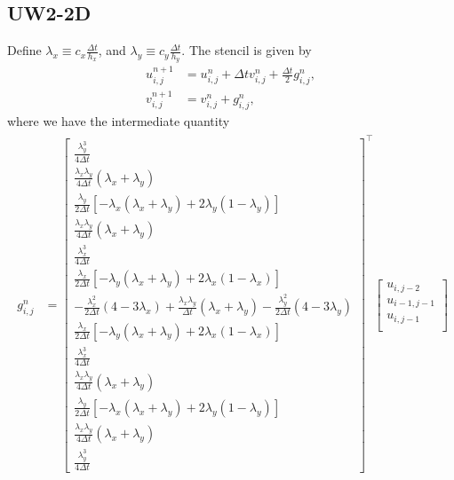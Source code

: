 \documentclass[12pt]{article}
\begin{document}
\subsection{UW2-2D}
Define $\lambda_x \equiv c_x \tfrac{\Delta t}{h_x}$, and $\lambda_y \equiv c_y \tfrac{\Delta t}{h_y}$. The stencil \cite[eq. (103)--(106)]{Banks2012} is given by
\begin{align}
u_{i,j}^{n+1} 
&= 
u_{i,j} ^n  + \Delta t v_{i,j}^n +  \tfrac{\Delta t}{2} g_{i,j} ^n,
\\
v_{i,j}^{n+1} 
&= 
v_{i,j} ^n + g_{i,j}^n,
\end{align}
where we have the intermediate quantity
\begin{align}
\begin{aligned}
g_{i,j}^{n} &= 
\begin{bmatrix}
\tfrac{\lambda_y^3}{4 \Delta t} \\
\tfrac{\lambda_x \lambda_y}{4 \Delta t}(\lambda_x + \lambda_y) \\  
\tfrac{\lambda_y}{2 \Delta t}[ -\lambda_x(\lambda_x + \lambda_y)  + 2 \lambda_y(1 - \lambda_y)] \\
\tfrac{\lambda_x \lambda_y}{4 \Delta t}(\lambda_x + \lambda_y) \\ 
\tfrac{\lambda_x^3}{4 \Delta t} \\ 
\tfrac{\lambda_x}{2 \Delta t}[ -\lambda_y(\lambda_x + \lambda_y)  + 2 \lambda_x(1 - \lambda_x)] \\
-\tfrac{\lambda_x^2}{2 \Delta t}( 4 - 3 \lambda_x ) 
+\tfrac{\lambda_x \lambda_y}{\Delta t}(\lambda_x + \lambda_y) 
-\tfrac{\lambda_y^2}{2 \Delta t}( 4 - 3 \lambda_y ) \\  
\tfrac{\lambda_x}{2 \Delta t}[ -\lambda_y(\lambda_x + \lambda_y)  + 2 \lambda_x(1 - \lambda_x)] \\
\tfrac{\lambda_x^3}{4 \Delta t} \\ 
\tfrac{\lambda_x \lambda_y}{4 \Delta t}(\lambda_x + \lambda_y) \\ 
\tfrac{\lambda_y}{2 \Delta t}[ -\lambda_x(\lambda_x + \lambda_y)  + 2 \lambda_y(1 - \lambda_y)] \\
\tfrac{\lambda_x \lambda_y}{4 \Delta t}(\lambda_x + \lambda_y) \\ 
\tfrac{\lambda_y^3}{4 \Delta t}  
\end{bmatrix}^\top
\begin{bmatrix}
u_{i,j-2} \\
u_{i-1,j-1} \\
u_{i,j-1} \\

\end{bmatrix}
\end{aligned}
\end{align}
\end{document}
